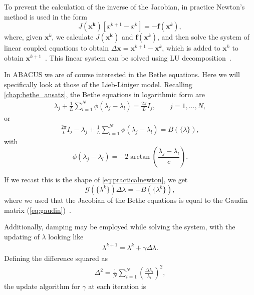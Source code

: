 \documentclass[11pt, a4paper]{report} %
\begin{document}
To prevent the calculation of the inverse of the Jacobian, in practice Newton's method is used in the form
\begin{equation}\label{eq:practicalnewton}
  J(\mathbf{x^k})[x^{k+1} - x^k] = - \mathbf{f}(\mathbf{x}^k),
\end{equation}
where, given \(\mathbf{x}^k\), we calculate \(J(\mathbf{x^k})\) and \( \mathbf{f}(\mathbf{x}^k)\), and then solve the system of linear coupled equations to obtain \(\Delta\mathbf{x}=\mathbf{x}^{k+1} - \mathbf{x}^k\), which is added to \(\mathbf{x}^k\) to obtain \(\mathbf{x}^{k+1}\)~\cite{Sueli2003}. 
This linear system can be solved using LU decomposition~\cite{Press2007}.

In ABACUS we are of course interested in the Bethe equations.
Here we will specifically look at those of the Lieb-Liniger model.
Recalling \cref{chap:bethe_ansatz}, the Bethe equations in logarithmic form are 
\begin{align}
  \lambda_j + \frac{1}{L} \sum_{l=1}^N \phi(\lambda_j - \lambda_l) = \frac{2\pi}{L}I_j, \qquad j = 1,\ldots,N,
\end{align}
or
\begin{align}
  \frac{2\pi}{L}I_j - \lambda_j + \frac{1}{L} \sum_{l=1}^N \phi(\lambda_j - \lambda_l) = B(\{\lambda\}),
\end{align}
with
\begin{equation}
  \phi(\lambda_j - \lambda_l) = -2\arctan\left(\frac{\lambda_j-\lambda_l}{c}\right).
\end{equation}

If we recast this is the shape of \cref{eq:practicalnewton}, we get
\begin{equation}
  \mathcal{G}(\{\lambda^k\}) \Delta \lambda = -B(\{\lambda^k\}),
\end{equation}
where we used that the Jacobian of the Bethe equations is equal to the Gaudin matrix (\cref{eq:gaudin})~\cite{Caux2009}.

Additionally, damping may be employed while solving the system, with the updating of \(\lambda\) looking like
\begin{align}
  \label{eq:dampednewton}
  \lambda^{k+1} = \lambda^k + \gamma \Delta \lambda.
\end{align}
Defining the difference squared as
\begin{align}
  \label{eq:51}
  \Delta^2 = \frac{1}{N}\sum_{i=1}^{N} \left(\frac{\Delta \lambda_i}{\lambda_i}\right)^2,
\end{align}
the update algorithm for \(\gamma\) at each iteration is
\begin{algorithm}
  \begin{algorithmic}[0]
    \Else{}
    \EndIf{}
  \end{algorithmic}
\end{algorithm}
\end{document}

